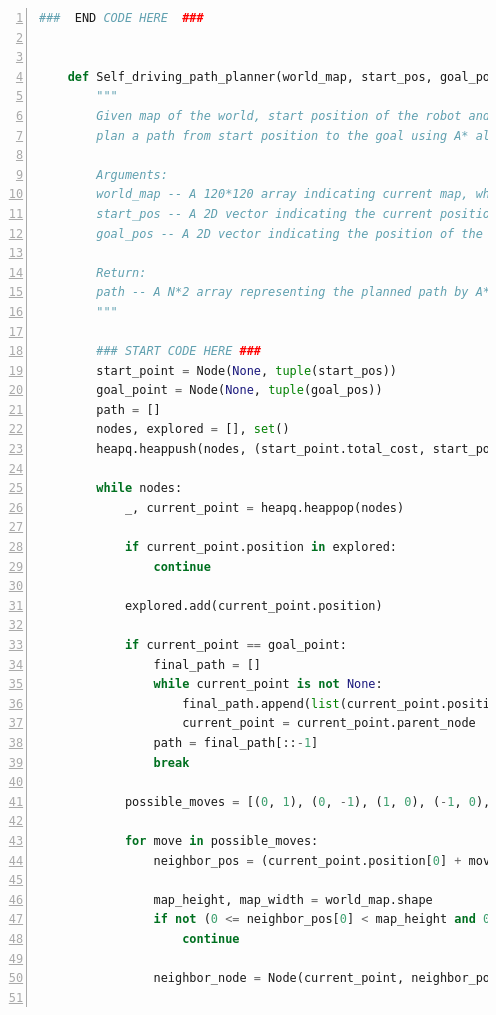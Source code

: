 \documentclass[aps,letterpaper,10pt]{revtex4}
\begin{document}
\begin{lstlisting}[language=Python, caption={Source Code for Task 1 (5-Task\_1.py)}, label={lst:task1_code}, basicstyle=\ttfamily\small, numbers=left, frame=tb, breaklines=true]
    ###  END CODE HERE  ###
    
    
    def Self_driving_path_planner(world_map, start_pos, goal_pos):
        """
        Given map of the world, start position of the robot and the position of the goal, 
        plan a path from start position to the goal using A* algorithm.
    
        Arguments:
        world_map -- A 120*120 array indicating current map, where 0 indicating traversable and 1 indicating obstacles.
        start_pos -- A 2D vector indicating the current position of the robot.
        goal_pos -- A 2D vector indicating the position of the goal.
    
        Return:
        path -- A N*2 array representing the planned path by A* algorithm.
        """
    
        ### START CODE HERE ###
        start_point = Node(None, tuple(start_pos))
        goal_point = Node(None, tuple(goal_pos))
        path = []
        nodes, explored = [], set()
        heapq.heappush(nodes, (start_point.total_cost, start_point))
    
        while nodes:
            _, current_point = heapq.heappop(nodes)
    
            if current_point.position in explored: 
                continue
    
            explored.add(current_point.position)
            
            if current_point == goal_point:
                final_path = []
                while current_point is not None:
                    final_path.append(list(current_point.position))
                    current_point = current_point.parent_node
                path = final_path[::-1]
                break
    
            possible_moves = [(0, 1), (0, -1), (1, 0), (-1, 0), (1, 1), (1, -1), (-1, 1), (-1, -1)]
            
            for move in possible_moves:
                neighbor_pos = (current_point.position[0] + move[0], current_point.position[1] + move[1])
                
                map_height, map_width = world_map.shape
                if not (0 <= neighbor_pos[0] < map_height and 0 <= neighbor_pos[1] < map_width) or world_map[int(neighbor_pos[0])][int(neighbor_pos[1])] != 0 or neighbor_pos in explored:
                    continue
                
                neighbor_node = Node(current_point, neighbor_pos)
    

\end{lstlisting}
\end{document}
